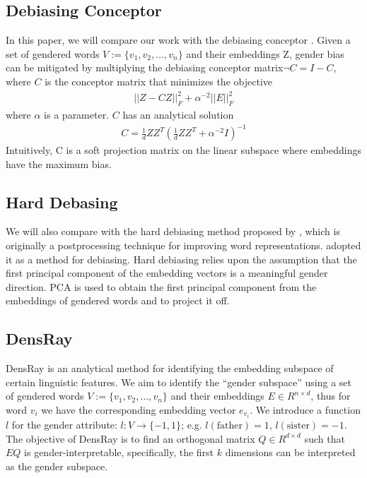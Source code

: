 \subsection{Debiasing Conceptor}
In this paper, we will compare our work with the debiasing conceptor \cite{karve2019conceptor}. Given a set of gendered words $V:=\{v_1,v_2,\dots,v_n\}$ and their embeddings Z, gender bias can be mitigated by multiplying the debiasing conceptor matrix$\neg C= I-C$, where $C$ is the conceptor matrix that minimizes the objective
\begin{eqnarray}
||Z-CZ||^2_F+\alpha^{-2}||E||^2_F
\end{eqnarray}
where $\alpha$ is a parameter. $C$ has an analytical solution
\begin{eqnarray}
C=\frac{1}{d}ZZ^{T}(\frac{1}{d}ZZ^{T}+\alpha^{-2}I)^{-1}
\end{eqnarray}
Intuitively, C is a soft projection matrix on the linear subspace where embeddings have the maximum bias.

\subsection{Hard Debasing}
We will also compare with the hard debiasing method proposed
by , which is originally a postprocessing
technique for improving word
representations.  adopted it as a
method for debiasing. Hard debiasing relies upon
the assumption that the first principal component of the
embedding vectors is a meaningful gender direction. 
PCA is used to obtain the first
principal component from the embeddings of gendered words
and to project it off.

\subsection{DensRay}
DensRay is an analytical method for identifying the
embedding subspace of certain linguistic features. We aim to
identify the ``gender subspace'' using a set of gendered words
$V:=\{v_1,v_2,\dots,v_n\}$ and their embeddings $E \in
R^{n\times d}$, thus for word $v_i$ we have the
corresponding embedding vector $e_{v_i}$. We
introduce a function $l$ for the gender attribute:
$l:V\to \{-1,1\}$;
e.g. $l(\mbox{father})=1$, $l(\mbox{sister})=-1$. The objective of DensRay
is to find an orthogonal matrix $Q\in R^{d\times d}$ such
that $EQ$ is gender-interpretable, specifically, the first
$k$ dimensions can be interpreted as the gender subspace.

